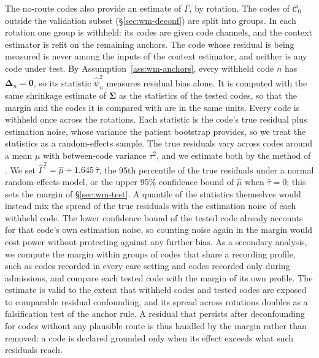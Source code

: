 The no-route codes also provide an estimate of $\Gamma$, by rotation. The codes of $\mathcal{C}_0$ outside the validation subset (\S\ref{sec:wm-deconf}) are split into groups. In each rotation one group is withheld: its codes are given code channels, and the context estimator is refit on the remaining anchors. The code whose residual is being measured is never among the inputs of the context estimator, and neither is any code under test. By Assumption~\ref{ass:wm-anchors}, every withheld code $n$ has $\boldsymbol{\Delta}_n=\mathbf{0}$, so its statistic $\hat{\psi}^{2}_n$ measures residual bias alone. It is computed with the same shrinkage estimate of $\boldsymbol{\Sigma}$ as the statistics of the tested codes, so that the margin and the codes it is compared with are in the same units. Every code is withheld once across the rotations. Each statistic is the code's true residual plus estimation noise, whose variance the patient bootstrap provides, so we treat the statistics as a random-effects sample. The true residuals vary across codes around a mean $\mu$ with between-code variance $\tau^{2}$, and we estimate both by the method of \citet{dersimonian1986meta}. We set $\hat{\Gamma}^{2}=\hat{\mu}+1.645\,\hat{\tau}$, the 95th percentile of the true residuals under a normal random-effects model, or the upper 95\% confidence bound of $\hat{\mu}$ when $\hat{\tau}=0$; this sets the margin of \S\ref{sec:wm-test}. A quantile of the statistics themselves would instead mix the spread of the true residuals with the estimation noise of each withheld code. The lower confidence bound of the tested code already accounts for that code's own estimation noise, so counting noise again in the margin would cost power without protecting against any further bias. As a secondary analysis, we compute the margin within groups of codes that share a recording profile, such as codes recorded in every care setting and codes recorded only during admissions, and compare each tested code with the margin of its own profile. The estimate is valid to the extent that withheld codes and tested codes are exposed to comparable residual confounding, and its spread across rotations doubles as a falsification test of the anchor rule. A residual that persists after deconfounding for codes without any plausible route is thus handled by the margin rather than removed: a code is declared grounded only when its effect exceeds what such residuals reach.

